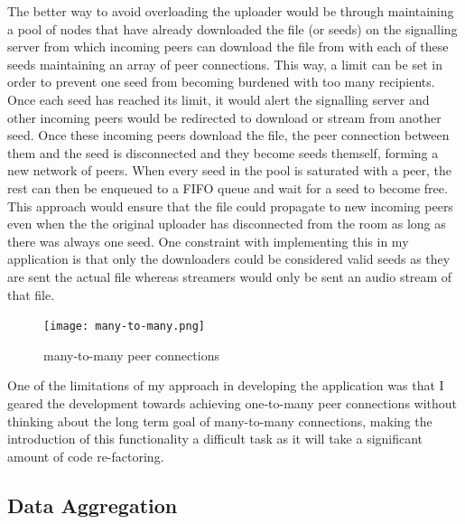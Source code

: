 \documentclass[]{report}
\begin{document}
			The better way to avoid overloading the uploader would be through maintaining a pool of nodes that have already downloaded the file (or seeds) on the signalling server from which incoming peers can download the file from with each of these seeds maintaining an array of peer connections. This way, a limit can be set in order to prevent one seed from becoming burdened with too many recipients. Once each seed has reached its limit, it would alert the signalling server and other incoming peers would be redirected to download or stream from another seed. Once these incoming peers download the file, the peer connection between them and the seed is disconnected and they become seeds themself, forming a new network of peers. When every seed in the pool is saturated with a peer, the rest can then be enqueued to a FIFO queue and wait for a seed to become free. This approach would ensure that the file could propagate to new incoming peers even when the the original uploader has disconnected from the room as long as there was always one seed. One constraint with implementing this in my application is that only the downloaders could be considered valid seeds as they are sent the actual file whereas streamers would only be sent an audio stream of that file.
			
			\begin{figure}[H]
				\caption{many-to-many peer connections}
				\centering
				\texttt{[image: many-to-many.png]}
			\end{figure}	
			
			One of the limitations of my approach in developing the application was that I geared the development towards achieving one-to-many peer connections without thinking about the long term goal of many-to-many connections, making the introduction of this functionality a difficult task as it will take a significant amount of code re-factoring.
			
			\subsection{Data Aggregation}
\end{document}
